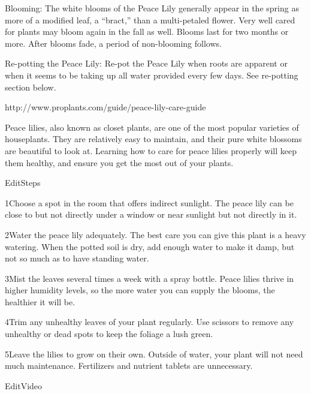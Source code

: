 \documentclass{book}
\begin{document}
Blooming:  The white blooms of the Peace Lily generally appear in the spring as more of a modified leaf, a “bract,” than a multi-petaled flower. Very well cared for plants may bloom again in the fall as well. Blooms last for two months or more. After blooms fade, a period of non-blooming follows.

Re-potting the Peace Lily:  Re-pot the Peace Lily when roots are apparent or when it seems to be taking up all water provided every few days. See re-potting section below.



http://www.proplants.com/guide/peace-lily-care-guide


Peace lilies, also known as closet plants, are one of the most popular varieties of houseplants. They are relatively easy to maintain, and their pure white blossoms are beautiful to look at. Learning how to care for peace lilies properly will keep them healthy, and ensure you get the most out of your plants.

 
EditSteps

1Choose a spot in the room that offers indirect sunlight. The peace lily can be close to but not directly under a window or near sunlight but not directly in it.

 

2Water the peace lily adequately. The best care you can give this plant is a heavy watering. When the potted soil is dry, add enough water to make it damp, but not so much as to have standing water.

3Mist the leaves several times a week with a spray bottle. Peace lilies thrive in higher humidity levels, so the more water you can supply the blooms, the healthier it will be.

4Trim any unhealthy leaves of your plant regularly. Use scissors to remove any unhealthy or dead spots to keep the foliage a lush green.

5Leave the lilies to grow on their own. Outside of water, your plant will not need much maintenance. Fertilizers and nutrient tablets are unnecessary.

 
EditVideo
 
\end{document}
